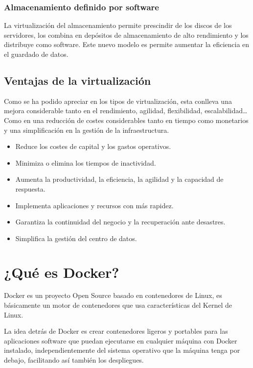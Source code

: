 \subsubsection{Almacenamiento definido por software}

La virtualización del almacenamiento permite prescindir de  los discos de los servidores, los combina en depósitos de almacenamiento de alto rendimiento y los distribuye como software. Este nuevo modelo es permite aumentar la eficiencia en el guardado de datos.
\pagebreak  

\subsection{Ventajas de la virtualización}

Como se ha podido apreciar en los tipos de virtualización, esta conlleva una mejora considerable tanto en el rendimiento, agilidad, flexibilidad, escalabilidad… Como en una reducción de costes considerables tanto en tiempo como monetarios y una simplificación en la gestión de la infraestructura.

\begin{itemize}
\item Reduce los costes de capital y los gastos operativos.
\item Minimiza o elimina los tiempos de inactividad.
\item Aumenta la productividad, la eficiencia, la agilidad y la capacidad de respuesta.
\item Implementa aplicaciones y recursos con más rapidez.
\item Garantiza la continuidad del negocio y la recuperación ante desastres.
\item Simplifica la gestión del centro de datos. 
\end{itemize}

\section{¿Qué es Docker?}

Docker es un proyecto Open Source basado en contenedores de Linux, es básicamente un motor de contenedores que usa características del Kernel de Linux.

La idea detrás de Docker es crear contenedores ligeros y portables para las aplicaciones software que puedan ejecutarse en cualquier máquina con Docker instalado,
independientemente del sistema operativo que la máquina tenga por debajo, facilitando así también los despliegues.

